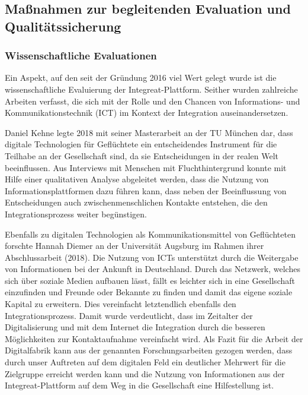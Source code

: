 \documentclass[12pt, a4paper]{article} %
\begin{document}
\hypertarget{mauxdfnahmen-zur-begleitenden-evaluation-und-qualituxe4tssicherung}{%
\subsection{Maßnahmen zur begleitenden Evaluation und
Qualitätssicherung}\label{mauxdfnahmen-zur-begleitenden-evaluation-und-qualituxe4tssicherung}}

\hypertarget{wissenschaftliche-evaluationen}{%
\subsubsection{Wissenschaftliche
Evaluationen}\label{wissenschaftliche-evaluationen}}

Ein Aspekt, auf den seit der Gründung 2016 viel Wert gelegt wurde ist
die wissenschaftliche Evaluierung der Integreat-Plattform. Seither
wurden zahlreiche Arbeiten verfasst, die sich mit der Rolle und den
Chancen von Informations- und Kommunikationstechnik (ICT) im Kontext der
Integration auseinandersetzen.

Daniel Kehne legte 2018 mit seiner Masterarbeit an der TU München dar,
dass digitale Technologien für Geflüchtete ein entscheidendes Instrument
für die Teilhabe an der Gesellschaft sind, da sie Entscheidungen in der
realen Welt beeinflussen. Aus Interviews mit Menschen mit
Fluchthintergrund konnte mit Hilfe einer qualitativen Analyse abgeleitet
werden, dass die Nutzung von Informationsplattformen dazu führen kann,
dass neben der Beeinflussung von Entscheidungen auch
zwischenmenschlichen Kontakte entstehen, die den Integrationsprozess
weiter begünstigen.

Ebenfalls zu digitalen Technologien als Kommunikationsmittel von
Geflüchteten forschte Hannah Diemer an der Universität Augsburg im
Rahmen ihrer Abschlussarbeit (2018). Die Nutzung von ICTs unterstützt
durch die Weitergabe von Informationen bei der Ankunft in Deutschland.
Durch das Netzwerk, welches sich über soziale Medien aufbauen lässt,
fällt es leichter sich in eine Gesellschaft einzufinden und Freunde oder
Bekannte zu finden und damit das eigene soziale Kapital zu erweitern.
Dies vereinfacht letztendlich ebenfalls den Integrationsprozess. Damit
wurde verdeutlicht, dass im Zeitalter der Digitalisierung und mit dem
Internet die Integration durch die besseren Möglichkeiten zur
Kontaktaufnahme vereinfacht wird. Als Fazit für die Arbeit der
Digitalfabrik kann aus der genannten Forschungsarbeiten gezogen werden,
dass durch unser Auftreten auf dem digitalen Feld ein deutlicher
Mehrwert für die Zielgruppe erreicht werden kann und die Nutzung von
Informationen aus der Integreat-Plattform auf dem Weg in die
Gesellschaft eine Hilfestellung ist.
\end{document}
